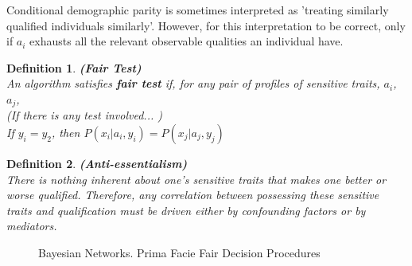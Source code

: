 \documentclass{article}
\newtheorem{definition}{Definition}
\begin{document}
Conditional demographic parity is sometimes interpreted as 'treating similarly qualified individuals similarly'. However, for this interpretation to be correct, only if $a_i$ exhausts all the relevant observable qualities an individual have. 


\begin{definition}
\textup{\textbf{ (Fair Test) } \\
\indent
An algorithm satisfies \textbf{fair test} if, for any pair of profiles of sensitive traits}, $a_i$,  $a_j$, \\
(If there is any test involved... )
\\

\textup{If } $y_i = y_2$\textup{, then } $P(x_i|a_i, y_i) = P(x_j|a_j, y_j)$
\end{definition}


\begin{definition}
\textup{\textbf{ (Anti-essentialism) } \\
There is nothing \textit{inherent} about one’s sensitive traits that makes one better or worse qualified. Therefore, any correlation between possessing these sensitive traits and qualification must be driven either by confounding factors or by mediators.}
\end{definition}





  \begin{figure}[h]
 \caption{Bayesian Networks. Prima Facie Fair Decision Procedures}
  \label{fig:fit}
    \label{fig:my_label}
\end{figure}
\end{document}

